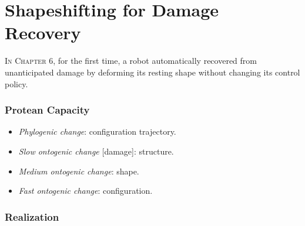



\section{Shapeshifting for Damage Recovery}


\textsc{In Chapter 6,}
for the first time, a robot automatically recovered from unanticipated damage by deforming its resting shape without changing its control policy.

\subsubsection*{Protean Capacity}

\begin{itemize}
    \item \textit{Phylogenic change}: configuration trajectory.
    \item \textit{Slow ontogenic change} [damage]: structure.
    \item \textit{Medium ontogenic change}: shape.
    \item \textit{Fast ontogenic change}: configuration.
\end{itemize}


\subsubsection*{Realization}

